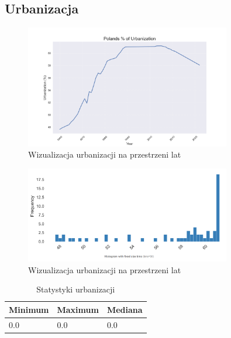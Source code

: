 \documentclass[11pt]{article}
\begin{document}
\subsection*{Urbanizacja}
\begin{figure}[H]
        \centering
        \includegraphics[width=0.8\textwidth]{polish_urbanization.png}
        \caption{Wizualizacja urbanizacji na przestrzeni lat}
\end{figure}
\begin{figure}[H]
        \centering
        \includegraphics[width=0.8\textwidth]{images/histogram_urbanizacja.png}
        \caption{Wizualizacja urbanizacji na przestrzeni lat}
\end{figure}
\begin{table}[H]
        \centering
        \begin{tabular}{|l|l|l|}
        \hline
        Minimum & Maximum & Mediana \\ \hline
        0.0 & 0.0 & 0.0 \\ \hline
        \end{tabular}
        \caption{Statystyki urbanizacji}
        \end{table}
\end{document}
